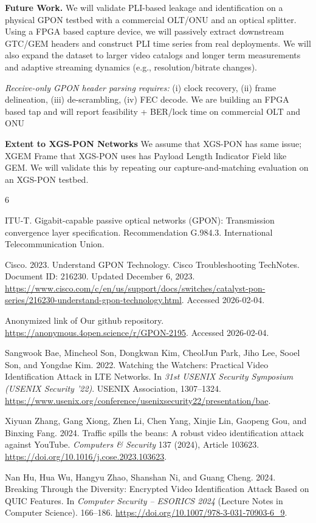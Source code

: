 \documentclass[sigconf,anonymous]{acmart}
\begin{document}
\textbf{Future Work.}
We will validate PLI-based leakage and identification on a physical GPON testbed with a commercial OLT/ONU and an optical splitter.
Using a FPGA based capture device, we will passively extract downstream GTC/GEM headers and construct PLI time series from real deployments.
We will also expand the dataset to larger video catalogs and longer term measurements and adaptive streaming dynamics (e.g., resolution/bitrate changes). 

\emph{Receive-only GPON header parsing requires:}
(i) clock recovery, (ii) frame delineation, (iii) de-scrambling, (iv) FEC decode. We are building an FPGA based tap and will report feasibility + BER/lock time on commercial OLT and ONU

\textbf{Extent to XGS-PON Networks} We assume that XGS-PON has same issue; XGEM Frame that XGS-PON uses has Payload Length Indicator Field like GEM. We will validate this by repeating our capture-and-matching evaluation on an XGS-PON testbed.

\begin{thebibliography}{6}

ITU-T. Gigabit-capable passive optical networks (GPON): Transmission convergence layer specification. Recommendation G.984.3. International Telecommunication Union.

Cisco. 2023. Understand GPON Technology. Cisco Troubleshooting TechNotes. Document ID: 216230. Updated December 6, 2023. \url{https://www.cisco.com/c/en/us/support/docs/switches/catalyst-pon-series/216230-understand-gpon-technology.html}. Accessed 2026-02-04.

Anonymized link of Our github repository. \url{https://anonymous.4open.science/r/GPON-2195}. Accessed 2026-02-04.

Sangwook Bae, Mincheol Son, Dongkwan Kim, CheolJun Park, Jiho Lee, Sooel Son, and Yongdae Kim. 2022. Watching the Watchers: Practical Video Identification Attack in LTE Networks. In \emph{31st USENIX Security Symposium (USENIX Security '22)}. USENIX Association, 1307--1324. \url{https://www.usenix.org/conference/usenixsecurity22/presentation/bae}.

Xiyuan Zhang, Gang Xiong, Zhen Li, Chen Yang, Xinjie Lin, Gaopeng Gou, and Binxing Fang. 2024. Traffic spills the beans: A robust video identification attack against YouTube. \emph{Computers \& Security} 137 (2024), Article 103623. \url{https://doi.org/10.1016/j.cose.2023.103623}.

Nan Hu, Hua Wu, Hangyu Zhao, Shanshan Ni, and Guang Cheng. 2024. Breaking Through the Diversity: Encrypted Video Identification Attack Based on QUIC Features. In \emph{Computer Security -- ESORICS 2024} (Lecture Notes in Computer Science). 166--186. \url{https://doi.org/10.1007/978-3-031-70903-6_9}.

\end{thebibliography}
\end{document}
